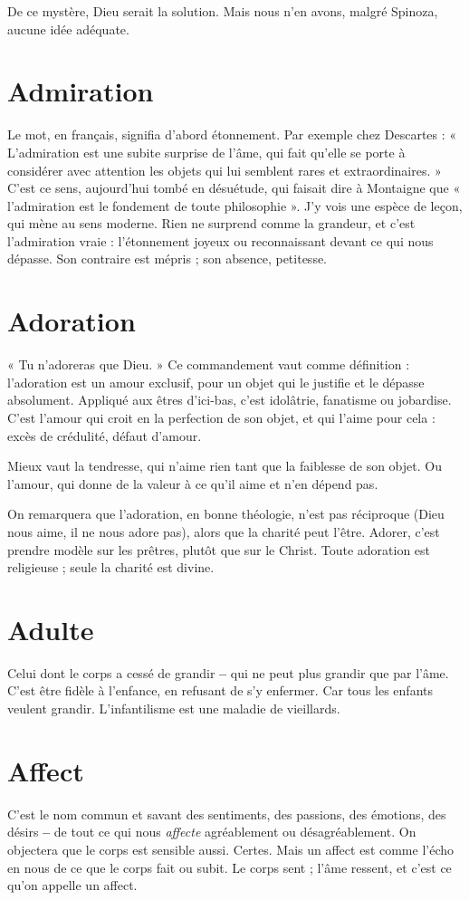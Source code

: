 De ce mystère, Dieu serait la solution. Mais nous n’en avons, malgré Spinoza,
aucune idée adéquate.

\section{Admiration}
Le mot, en français, signifia d’abord étonnement. Par exemple
chez Descartes : « L’admiration est une subite surprise de
l’âme, qui fait qu’elle se porte à considérer avec attention les objets qui lui semblent
rares et extraordinaires. » C’est ce sens, aujourd’hui tombé en désuétude,
qui faisait dire à Montaigne que « l'admiration est le fondement de toute
philosophie ». J’y vois une espèce de leçon, qui mène au sens moderne. Rien ne
surprend comme la grandeur, et c’est l’admiration vraie : l’étonnement joyeux
ou reconnaissant devant ce qui nous dépasse.
Son contraire est mépris ; son absence, petitesse.

\section{Adoration}
« Tu n’adoreras que Dieu. » Ce commandement vaut comme
définition : l’adoration est un amour exclusif, pour un objet
qui le justifie et le dépasse absolument. Appliqué aux êtres d’ici-bas, c’est idolâtrie,
fanatisme ou jobardise. C’est l’amour qui croit en la perfection de son
objet, et qui l'aime pour cela : excès de crédulité, défaut d'amour.

Mieux vaut la tendresse, qui n’aime rien tant que la faiblesse de son objet.
Ou l'amour, qui donne de la valeur à ce qu’il aime et n’en dépend pas.

On remarquera que l’adoration, en bonne théologie, n’est pas réciproque
(Dieu nous aime, il ne nous adore pas), alors que la charité peut l’être. Adorer,
c’est prendre modèle sur les prêtres, plutôt que sur le Christ. Toute adoration
est religieuse ; seule la charité est divine.

\section{Adulte}
Celui dont le corps a cessé de grandir {\bf --} qui ne peut plus grandir
que par l’âme. C’est être fidèle à l'enfance, en refusant de s’y
enfermer. Car tous les enfants veulent grandir. L’infantilisme est une maladie
de vieillards.

\section{Affect}
C’est le nom commun et savant des sentiments, des passions, des
émotions, des désirs {\bf --} de tout ce qui nous {\it affecte} agréablement ou
désagréablement. On objectera que le corps est sensible aussi. Certes. Mais un
affect est comme l’écho en nous de ce que le corps fait ou subit. Le corps sent ;
l'âme ressent, et c’est ce qu’on appelle un affect.

